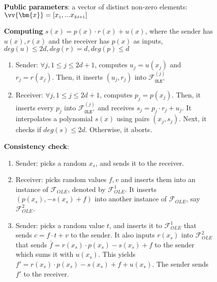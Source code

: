 \begin{figure}[ht]
\setlength{\fboxsep}{0.7pt}
\begin{center}
\begin{boxedminipage}{12.3cm}
\begin{enumerate}
\small{
\item [$\bullet$] \textbf{Public parameters}: a vector of distinct non-zero elements: $\vv{\bm{x}}= [x_{\scriptscriptstyle 1},...x_{\scriptscriptstyle 2d+1}]$
\item \textbf{Computing} $s(x)=p(x)\cdot r(x)+u(x)$, where the sender has  $u(x),r(x)$ and the receiver has  $p(x)$ as inputs, $deg(u)\leq 2d, deg(r)=d, deg(p)\leq d$
\begin{enumerate}
\item \label{sender-evaluate} Sender: $\forall j, 1\leq j\leq 2d+1$, computes $u_{\scriptscriptstyle j}=u(x_{\scriptscriptstyle j})$ and $r_{\scriptscriptstyle j}=r(x_{\scriptscriptstyle j})$. Then, it  inserts $(u_{\scriptscriptstyle j}, r_{\scriptscriptstyle j})$ into  $ \mathcal{F}^{\scriptscriptstyle (j)}_{\mathtt{OLE}^{\scriptscriptstyle +}}$
\item\label{computing-receiver} Receiver:  $\forall j, 1 \leq j\leq 2d+1$, computes $p_{\scriptscriptstyle j}=p(x_{\scriptscriptstyle j})$. Then, it  inserts every $p_{\scriptscriptstyle j}$ into $ \mathcal{F}^{\scriptscriptstyle (j)}_{\mathtt{OLE}^{\scriptscriptstyle +}}$  and receives $s_{\scriptscriptstyle j}=p_{\scriptscriptstyle j}\cdot r_{\scriptscriptstyle j}+u_{\scriptscriptstyle j}$. It interpolates a polynomial $s(x)$ using pairs $(x_{\scriptscriptstyle j},s_{\scriptscriptstyle j})$. Next, it checks if $deg(s)\leq2d$. Otherwise, it aborts.
\end{enumerate}
\item \label{Consistency-check} \textbf{Consistency check}: 
\begin{enumerate}
\item \label{picking-random-x}Sender: picks a random $x_{\scriptscriptstyle s}$, and sends it to the receiver. 
\item\label{receiver-OLE-invocation} Receiver: picks random values $f,v$ and inserts them into an instance of $\mathcal{F}_{\scriptscriptstyle OLE}$, denoted by $\mathcal{F}_{\scriptscriptstyle OLE}^{\scriptscriptstyle 1}$. It inserts $(p(x_{\scriptscriptstyle s}), -s(x_{\scriptscriptstyle s})+f)$ into another instance of $\mathcal{F}_{\scriptscriptstyle OLE}$, say $\mathcal{F}_{\scriptscriptstyle OLE}^{\scriptscriptstyle 2}$. 
\item\label{inserting-to-OLE} Sender: picks a random value $t$, and inserts it to $\mathcal{F}_{\scriptscriptstyle OLE}^{\scriptscriptstyle 1}$ that sends $c=f\cdot t+v$ to  the sender. It also inputs $r(x_{\scriptscriptstyle s})$ into $\mathcal{F}_{\scriptscriptstyle OLE}^{\scriptscriptstyle 2}$ that sends   $\bar{f}=r(x_{\scriptscriptstyle s})\cdot p(x_{\scriptscriptstyle s})-s(x_{\scriptscriptstyle s})+f$ to the sender which sums it with $u(x_{\scriptscriptstyle s})$. This   yields $f'= r(x_{\scriptscriptstyle s})\cdot p(x_{\scriptscriptstyle s})-s(x_{\scriptscriptstyle s})+f+u(x_{\scriptscriptstyle s})$. The sender sends $f'$ to the receiver.

\end{enumerate}}
\end{enumerate}
\end{boxedminipage}
\end{center}
\end{figure}
